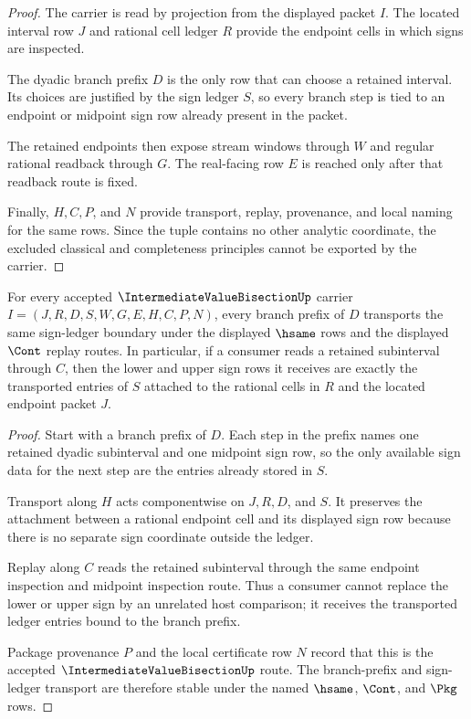 \begin{proof}
The carrier is read by projection from the displayed packet $I$. The located interval row $J$ and rational cell ledger $R$ provide the endpoint cells in which signs are inspected.

The dyadic branch prefix $D$ is the only row that can choose a retained interval. Its choices are justified by the sign ledger $S$, so every branch step is tied to an endpoint or midpoint sign row already present in the packet.

The retained endpoints then expose stream windows through $W$ and regular rational readback through $G$. The real-facing row $E$ is reached only after that readback route is fixed.

Finally, $H,C,P$, and $N$ provide transport, replay, provenance, and local naming for the same rows. Since the tuple contains no other analytic coordinate, the excluded classical and completeness principles cannot be exported by the carrier.
\end{proof}

\begin{theorem}
\label{thm:intermediate-value-sign-ledger-stability}
For every accepted $\IntermediateValueBisectionUp$ carrier $I=(J,R,D,S,W,G,E,H,C,P,N)$, every branch prefix of $D$ transports the same sign-ledger boundary under the displayed $\hsame$ rows and the displayed $\Cont$ replay routes. In particular, if a consumer reads a retained subinterval through $C$, then the lower and upper sign rows it receives are exactly the transported entries of $S$ attached to the rational cells in $R$ and the located endpoint packet $J$.
\end{theorem}
\begin{proof}
Start with a branch prefix of $D$. Each step in the prefix names one retained dyadic subinterval and one midpoint sign row, so the only available sign data for the next step are the entries already stored in $S$.

Transport along $H$ acts componentwise on $J,R,D$, and $S$. It preserves the attachment between a rational endpoint cell and its displayed sign row because there is no separate sign coordinate outside the ledger.

Replay along $C$ reads the retained subinterval through the same endpoint inspection and midpoint inspection route. Thus a consumer cannot replace the lower or upper sign by an unrelated host comparison; it receives the transported ledger entries bound to the branch prefix.

Package provenance $P$ and the local certificate row $N$ record that this is the accepted $\IntermediateValueBisectionUp$ route. The branch-prefix and sign-ledger transport are therefore stable under the named $\hsame$, $\Cont$, and $\Pkg$ rows.
\end{proof}

